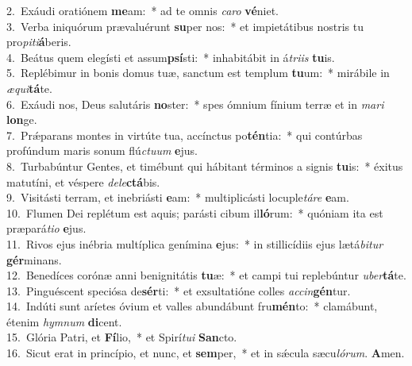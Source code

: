 {2.~}Exáudi oratiónem \textbf{me}am:~* ad te omnis \textit{ca}\textit{ro} \textbf{vé}niet.\\
{3.~}Verba iniquórum prævaluérunt \textbf{su}per nos:~* et impietátibus nostris tu pro\textit{pi}\textit{ti}\textbf{á}beris.\\
{4.~}Beátus quem elegísti et assum\textbf{psí}sti:~* inhabitábit in á\textit{tri}\textit{is} \textbf{tu}is.\\
{5.~}Replébimur in bonis domus tuæ, sanctum est templum \textbf{tu}um:~* mirábile in \textit{æ}\textit{qui}\textbf{tá}te.\\
{6.~}Exáudi nos, Deus salutáris \textbf{no}ster:~* spes ómnium fínium terræ et in \textit{ma}\textit{ri} \textbf{lon}ge.\\
{7.~}Prǽparans montes in virtúte tua, accínctus po\textbf{tén}tia:~* qui contúrbas profúndum maris sonum flú\textit{ctu}\textit{um} \textbf{e}jus.\\
{8.~}Turbabúntur Gentes, et timébunt qui hábitant términos a signis \textbf{tu}is:~* éxitus matutíni, et véspere \textit{de}\textit{le}\textbf{ctá}bis.\\
{9.~}Visitásti terram, et inebriásti \textbf{e}am:~* multiplicásti locuple\textit{tá}\textit{re} \textbf{e}am.\\
{10.~}Flumen Dei replétum est aquis; parásti cibum il\textbf{ló}rum:~* quóniam ita est præpará\textit{ti}\textit{o} \textbf{e}jus.\\
{11.~}Rivos ejus inébria multíplica genímina \textbf{e}jus:~* in stillicídiis ejus lætá\textit{bi}\textit{tur} \textbf{gér}minans.\\
{12.~}Benedíces corónæ anni benignitátis \textbf{tu}æ:~* et campi tui replebúntur \textit{u}\textit{ber}\textbf{tá}te.\\
{13.~}Pinguéscent speciósa de\textbf{sér}ti:~* et exsultatióne colles \textit{ac}\textit{cin}\textbf{gén}tur.\\
{14.~}Indúti sunt aríetes óvium et valles abundábunt fru\textbf{mén}to:~* clamábunt, étenim \textit{hym}\textit{num} \textbf{di}cent.\\
{15.~}Glória Patri, et \textbf{Fí}lio,~* et Spirí\textit{tu}\textit{i} \textbf{San}cto.\\
{16.~}Sicut erat in princípio, et nunc, et \textbf{sem}per,~* et in sǽcula sæcu\textit{ló}\textit{rum}. \textbf{A}men.\\
